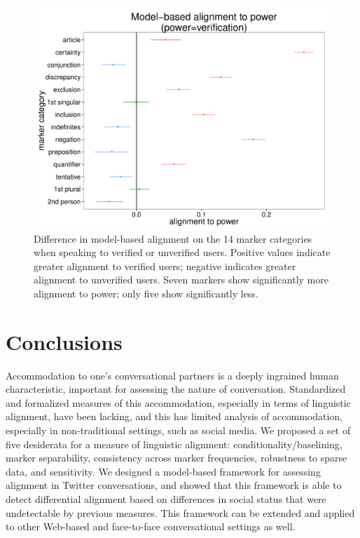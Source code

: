 \documentclass{acm_proc_article-sp}
\begin{document}
\begin{figure}
\centering
\includegraphics[width=.9\columnwidth]{graphics/www2016_ourpowerdiff_verif.pdf}
\caption{Difference in model-based alignment on the 14 marker categories when speaking to verified or unverified users. Positive values indicate greater alignment to verified users; negative indicates greater alignment to unverified users. Seven markers show significantly more alignment to power; only five show significantly less.}\label{fig:our-verified}
\end{figure}

\section{Conclusions}
Accommodation to one's conversational partners is a deeply ingrained human characteristic, important for assessing the nature of conversation.  Standardized and formalized measures of this accommodation, especially in terms of linguistic alignment, have been lacking, and this has limited analysis of accommodation, especially in non-traditional settings, such as social media.  We proposed a set of five desiderata for a measure of linguistic alignment: conditionality/baselining, marker separability, consistency across marker frequencies, robustness to sparse data, and sensitivity.  We designed a model-based framework for assessing alignment in Twitter conversations, and showed that this framework is able to detect differential alignment based on differences in social status that were undetectable by previous measures.  This framework can be extended and applied to other Web-based and face-to-face conversational settings as well.
\end{document}
